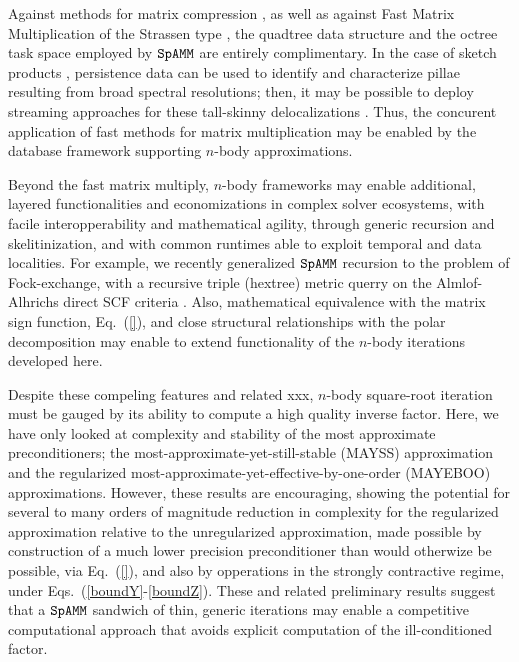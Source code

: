 \documentclass[letterpaper,twocolumn,amsmath,amsfont,amssymb,english,aps,jcp,preprintnumbers,groupaddress,nofootinbib,tightenlines,floatfix]{revtex4}
\theoremstyle{plain}
\theoremstyle{remark}
\theoremstyle{plain}
\begin{document}
Against methods for matrix compression \cite{}, as well as against Fast Matrix Multiplication of the Strassen type \cite{}, 
the quadtree data structure and the octree task space employed by $\tt SpAMM$ are entirely complimentary.  
In the case of sketch products \cite{}, persistence data can be used to identify and characterize pillae resulting 
from broad spectral resolutions; then, it may be possible to deploy streaming approaches for these tall-skinny delocalizations \cite{}.
Thus, the concurent application of fast methods for matrix multiplication may be enabled by the database framework supporting 
$n$-body approximations.  

Beyond the fast matrix multiply, $n$-body frameworks may enable additional, layered functionalities and economizations 
in complex solver ecosystems, with facile interopperability and mathematical agility, 
through generic recursion and skelitinization, and with common runtimes able to exploit temporal and data localities.
For example, we recently generalized $\tt SpAMM$ recursion to the problem of Fock-exchange, with a recursive triple (hextree) 
metric querry on the Almlof-Alhrichs direct SCF criteria \cite{}.  
Also, mathematical equivalence with the matrix sign function, Eq.~(\ref{}), and close structural relationships with the 
polar decomposition may enable to extend functionality of the $n$-body iterations developed here. 

Despite these compeling features and related xxx, $n$-body square-root iteration must be gauged by its ability to compute 
a high quality inverse factor.   Here, we have only looked at complexity and stability of the most 
approximate preconditioners; the most-approximate-yet-still-stable (MAYSS) approximation and the regularized 
most-approximate-yet-effective-by-one-order (MAYEBOO) approximations.    However, these results are encouraging, showing 
the potential for several to many orders of magnitude reduction in complexity for the regularized approximation 
relative to the unregularized approximation, made possible by   
construction of a much lower precision preconditioner than would otherwize be possible, via Eq.~(\ref{}), 
and also by opperations in the strongly contractive regime, under Eqs.~(\ref{boundY}-\ref{boundZ}).
These and related preliminary results \cite{} suggest that a $\tt SpAMM$ sandwich of thin,
generic iterations may enable a competitive computational approach that avoids explicit computation of the 
ill-conditioned factor. 

\appendix 
\end{document}
